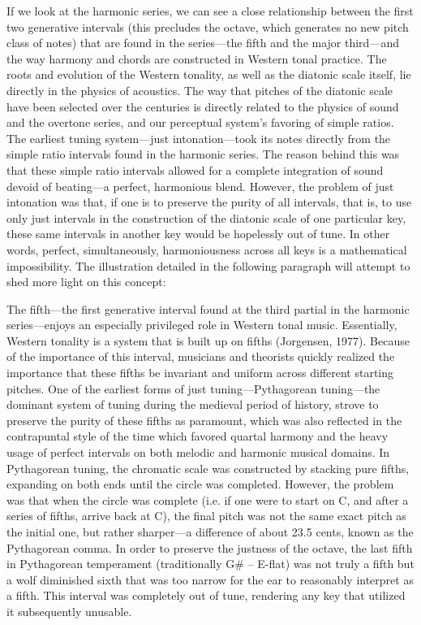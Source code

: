 If we look at the harmonic series, we can see a close relationship
between the first two generative intervals (this precludes the octave,
which generates no new pitch class of notes) that are found in the
series---the fifth and the major third---and the way harmony and chords
are constructed in Western tonal practice. The roots and evolution of
the Western tonality, as well as the diatonic scale itself, lie directly
in the physics of acoustics. The way that pitches of the diatonic scale
have been selected over the centuries is directly related to the physics
of sound and the overtone series, and our perceptual system's favoring
of simple ratios. The earliest tuning system---just intonation---took
its notes directly from the simple ratio intervals found in the harmonic
series. The reason behind this was that these simple ratio intervals
allowed for a complete integration of sound devoid of beating---a
perfect, harmonious blend. However, the problem of just intonation was
that, if one is to preserve the purity of all intervals, that is, to use
only just intervals in the construction of the diatonic scale of one
particular key, these same intervals in another key would be hopelessly
out of tune. In other words, perfect, simultaneously, harmoniousness
across all keys is a mathematical impossibility. The illustration
detailed in the following paragraph will attempt to shed more light on
this concept:

The fifth---the first generative interval found at the third partial in
the harmonic series---enjoys an especially privileged role in Western
tonal music. Essentially, Western tonality is a system that is built up
on fifths (Jorgensen, 1977). Because of the importance of this interval,
musicians and theorists quickly realized the importance that these
fifths be invariant and uniform across different starting pitches. One
of the earliest forms of just tuning---Pythagorean tuning---the
dominant system of tuning during the medieval period of history, strove
to preserve the purity of these fifths as paramount, which was also
reflected in the contrapuntal style of the time which favored quartal
harmony and the heavy usage of perfect intervals on both melodic and
harmonic musical domains. In Pythagorean tuning, the chromatic scale was
constructed by stacking pure fifths, expanding on both ends until the
circle was completed. However, the problem was that when the circle was
complete (i.e. if one were to start on C, and after a series of fifths,
arrive back at C), the final pitch was not the same exact pitch as the
initial one, but rather sharper---a difference of about 23.5 cents,
known as the Pythagorean comma. In order to preserve the justness of the
octave, the last fifth in Pythagorean temperament (traditionally G\# --
E-flat) was not truly a fifth but a wolf diminished sixth that was too
narrow for the ear to reasonably interpret as a fifth. This interval was
completely out of tune, rendering any key that utilized it subsequently
unusable.


